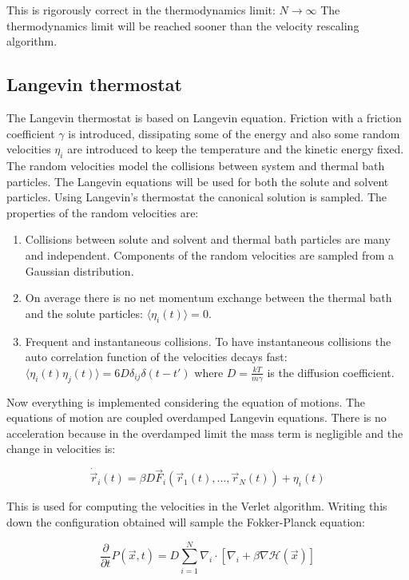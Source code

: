 	This is rigorously correct in the thermodynamics limit: $N\rightarrow\infty$
	The thermodynamics limit will be reached sooner than the velocity rescaling algorithm.

	\subsection{Langevin thermostat}
	The Langevin thermostat is based on Langevin equation.
	Friction with a friction coefficient $\gamma$ is introduced, dissipating some of the energy and also some random velocities $\eta_i$ are introduced to keep the temperature and the kinetic energy fixed.
	The random velocities model the collisions between system and thermal bath particles.
	The Langevin equations will be used for both the solute and solvent particles.
	Using Langevin's thermostat the canonical solution is sampled.
	The properties of the random velocities are:

	\begin{multicols}{2}
		\begin{enumerate}
			\item Collisions between solute and solvent and thermal bath particles are many and independent.
				Components of the random velocities are sampled from a Gaussian distribution.
			\item On average there is no net momentum exchange between the thermal bath and the solute particles: $\langle\eta_i(t)\rangle = 0$.
			\item Frequent and instantaneous collisions.
				To have instantaneous collisions the auto correlation function of the velocities decays fast: $\langle\eta_i(t)\eta_j(t)\rangle = 6D\delta_{ij}\delta(t-t')$ where $D = \frac{kT}{m\gamma}$ is the diffusion coefficient.
		\end{enumerate}
	\end{multicols}

	Now everything is implemented considering the equation of motions.
	The equations of motion are coupled overdamped Langevin equations.
	There is no acceleration because in the overdamped limit the mass term is negligible and the change in velocities is:

	$$\dot{\vec{r}}_i(t) = \beta D\vec{F}_i(\vec{r}_1(t), \dots, \vec{r}_N(t)) + \eta_i(t)$$

	This is used for computing the velocities in the Verlet algorithm.
	Writing this down the configuration obtained will sample the Fokker-Planck equation:

	$$\frac{\partial}{\partial t}P(\vec{x}, t) = D\sum\limits_{i=1}^{N}\nabla_i\cdot[\nabla_i+\beta\nabla\mathcal{H}(\vec{x})]$$

